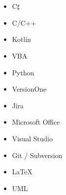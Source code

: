 \section{}

\vspace{8pt} %

\begin{multicols}{4}
\begin{itemize}
\item C\(\sharp\)
\item C/C++
\item Kotlin
\item VBA
\item Python
\item VersionOne
\item Jira
\item Microsoft Office
\item Visual Studio
\item Git / Subversion
\item \LaTeX
\item UML
\end{itemize}
\end{multicols}